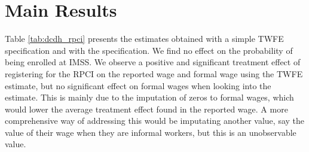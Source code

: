 \documentclass[10pt, oneside]{book}
\begin{document}
\section{Main Results}

Table \ref{tab:dcdh_rpci} presents the estimates obtained with a simple TWFE specification and with the \cite{de2020two} specification. We find no effect on the probability of being enrolled at IMSS. We observe a positive and significant treatment effect of registering for the RPCI on the reported wage and formal wage using the TWFE estimate, but no significant effect on formal wages when looking into the \cite{de2020two} estimate. This is mainly due to the imputation of zeros to formal wages, which would lower the average treatment effect found in the reported wage. A more comprehensive way of addressing this would be imputating another value, say the value of their wage when they are informal workers, but this is an unobservable value. \\
\end{document}
